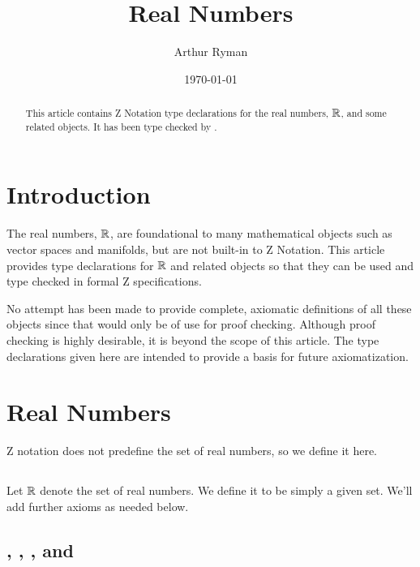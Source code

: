 \documentclass{amsart}
\begin{document}
\title{Real Numbers}
\author{Arthur Ryman}
\date{\today}

\begin{abstract}
This article contains Z Notation type declarations for the real numbers, $\mathbb{R}$, and some related objects.
It has been type checked by \fuzz.
\end{abstract}

\maketitle

\tableofcontents

\section{Introduction}

The real numbers, $\mathbb{R}$, are foundational to many mathematical objects such as vector spaces and manifolds,
but are not built-in to Z Notation.
This article provides type declarations for $\mathbb{R}$ and related objects so that they can be used and type checked in formal Z specifications.

No attempt has been made to provide complete, axiomatic definitions of all these objects since that would only be of use for proof checking.
Although proof checking is highly desirable, it is beyond the scope of this article.
The type declarations given here are intended to provide a basis for future axiomatization.

\section{Real Numbers}

Z notation does not predefine the set of real numbers, so we define it here.

\subsection{}

Let $\mathbb{R}$ denote the set of real numbers.
We define it to be simply a given set.
We'll add further axioms as needed below.

\begin{zed}
[\R]
\end{zed}

\subsection{, , , and }
\end{document}
